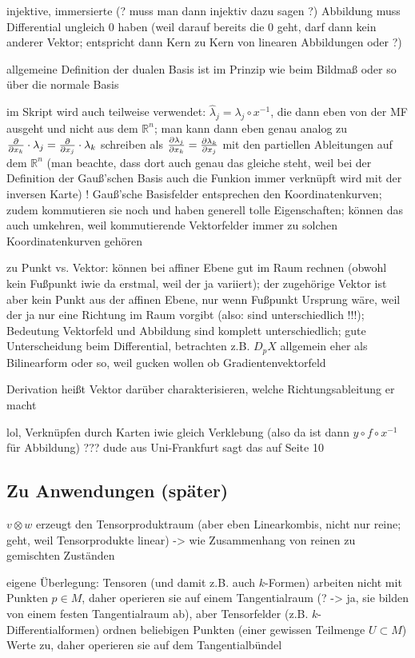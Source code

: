 injektive, immersierte (? muss man dann injektiv dazu sagen ?) Abbildung muss Differential ungleich 0 haben (weil darauf bereits die 0 geht, darf dann kein anderer Vektor; entspricht dann Kern zu Kern von linearen Abbildungen oder ?)




allgemeine Definition der dualen Basis ist im Prinzip wie beim Bildmaß oder so über die normale Basis

im Skript wird auch teilweise verwendet: $\hat{\lambda}_j = \lambda_j \circ x^{-1}$, die dann eben von der MF ausgeht und nicht aus dem $\mathbb{R}^n$; man kann dann eben genau analog zu $\pdv{x_k} \cdot \lambda_j = \pdv{x_j} \cdot \lambda_k$ schreiben als $\pdv{\lambda_j}{x_k} = \pdv{\lambda_k}{x_j}$ mit den partiellen Ableitungen auf dem $\mathbb{R}^n$ (man beachte, dass dort auch genau das gleiche steht, weil bei der Definition der Gauß'schen Basis auch die Funkion immer verknüpft wird mit der inversen Karte) ! Gauß'sche Basisfelder entsprechen den Koordinatenkurven; zudem kommutieren sie noch und haben generell tolle Eigenschaften; können das auch umkehren, weil kommutierende Vektorfelder immer zu solchen Koordinatenkurven gehören


zu Punkt vs. Vektor: können bei affiner Ebene gut im Raum rechnen (obwohl kein Fußpunkt iwie da erstmal, weil der ja variiert); der zugehörige Vektor ist aber kein Punkt aus der affinen Ebene, nur wenn Fußpunkt Ursprung wäre, weil der ja nur eine Richtung im Raum vorgibt (also: sind unterschiedlich !!!); Bedeutung Vektorfeld und Abbildung sind komplett unterschiedlich; gute Unterscheidung beim Differential, betrachten z.B. $D_p X$ allgemein eher als Bilinearform oder so, weil gucken wollen ob Gradientenvektorfeld

Derivation heißt Vektor darüber charakterisieren, welche Richtungsableitung er macht


lol, Verknüpfen durch Karten iwie gleich Verklebung (also da ist dann $y \circ f \circ x^{-1}$ für Abbildung) ??? dude aus Uni-Frankfurt sagt das auf Seite 10



		\subsection*{Zu Anwendungen (später)}
$v \otimes w$ erzeugt den Tensorproduktraum (aber eben Linearkombis, nicht nur reine; geht, weil Tensorprodukte linear) -> wie Zusammenhang von reinen zu gemischten Zuständen

eigene Überlegung: Tensoren (und damit z.B. auch $k$-Formen) arbeiten nicht mit Punkten $p \in M$, daher operieren sie auf einem Tangentialraum (? -> ja, sie bilden von einem festen Tangentialraum ab), aber Tensorfelder (z.B. $k$-Differentialformen) ordnen beliebigen Punkten (einer gewissen Teilmenge $U \subset M$) Werte zu, daher operieren sie auf dem Tangentialbündel


